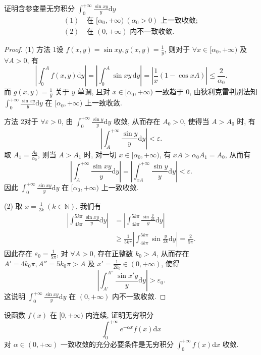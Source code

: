 \begin{example}\label{example:ma-17-2-2}
证明含参变量无穷积分 $\int_0^{+\infty}\frac{\sin xy}{y}\mathrm dy$
\[
\begin{gathered}
  (1)\quad \text{在 } [\alpha_0,+\infty)\ (\alpha_0>0) \text{ 上一致收敛};\\
  (2)\quad \text{在 } (0,+\infty) \text{ 内不一致收敛}.
\end{gathered}
\]
\end{example}


\begin{proof}
(1) 方法 1\quad 设 $f(x,y)=\sin xy,g(x,y)=\frac1y$, 则对于 $\forall x\in[\alpha_0,+\infty)$ 及 $\forall A>0$, 有
\[
  \left|\int_0^A f(x,y)\mathrm dy\right|
  =
  \left|\int_0^A\sin xy\,\mathrm dy\right|
  =
  \left|\frac1x(1-\cos xA)\right|
  \leqslant\frac2{\alpha_0}.
\]
而 $g(x,y)=\frac1y$ 关于 $y$ 单调, 且对 $x\in[\alpha_0,+\infty)$ 一致趋于 $0$, 由狄利克雷判别法知 $\int_0^{+\infty}\frac{\sin xy}{y}\mathrm dy$ 在 $[\alpha_0,+\infty)$ 上一致收敛.

方法 2\quad 对于 $\forall\varepsilon>0$, 由 $\int_0^{+\infty}\frac{\sin y}{y}\mathrm dy$ 收敛, 从而存在 $A_0>0$, 使得当 $A>A_0$ 时, 有
\[
  \left|\int_A^{+\infty}\frac{\sin y}{y}\mathrm dy\right|<\varepsilon.
\]
取 $A_1=\frac{A_0}{\alpha_0}$, 则当 $A>A_1$ 时, 对一切 $x\in[\alpha_0,+\infty)$, 有 $xA>\alpha_0 A_1=A_0$, 从而有
\[
  \left|\int_A^{+\infty}\frac{\sin xy}{y}\mathrm dy\right|
  =
  \left|\int_{xA}^{+\infty}\frac{\sin y}{y}\mathrm dy\right|
  <\varepsilon.
\]
因此 $\int_0^{+\infty}\frac{\sin xy}{y}\mathrm dy$ 在 $[\alpha_0,+\infty)$ 上一致收敛.

(2) 取 $x=\frac1{2k}\ (k\in\mathbb N)$, 我们有
\[
\begin{aligned}
  \left|\int_{4k\pi}^{5k\pi}\frac{\sin xy}{y}\mathrm dy\right|
  &=\left|\int_{4k\pi}^{5k\pi}\frac{\sin\frac{y}{2k}}{y}\mathrm dy\right|\\
  &\geqslant \frac1{5k\pi}\left|\int_{4k\pi}^{5k\pi}\sin\frac{y}{2k}\mathrm dy\right|
  =\frac2{5\pi}.
\end{aligned}
\]
因此存在 $\varepsilon_0=\frac1{5\pi}$, 对 $\forall A>0$, 存在正整数 $k_0>A$, 从而存在 $A'=4k_0\pi,A''=5k_0\pi>A$ 及 $x'=\frac1{2k_0}\in(0,+\infty)$, 使得
\[
  \left|\int_{A'}^{A''}\frac{\sin x'y}{y}\mathrm dy\right|>\varepsilon_0.
\]
这说明 $\int_0^{+\infty}\frac{\sin xy}{y}\mathrm dy$ 在 $(0,+\infty)$ 内不一致收敛.
\end{proof}


\begin{example}\label{example:ma-17-2-3}
设函数 $f(x)$ 在 $[0,+\infty)$ 内连续, 证明无穷积分
\[
  \int_0^{+\infty}e^{-\alpha x}f(x)\mathrm dx
\]
对 $\alpha\in(0,+\infty)$ 一致收敛的充分必要条件是无穷积分 $\int_0^{+\infty}f(x)\mathrm dx$ 收敛.
\end{example}


